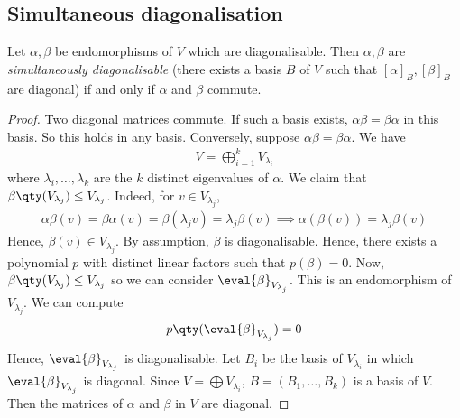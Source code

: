 \subsection{Simultaneous diagonalisation}
\begin{theorem}
	Let $\alpha, \beta$ be endomorphisms of $V$ which are diagonalisable.
	Then $\alpha, \beta$ are \textit{simultaneously diagonalisable} (there exists a basis $B$ of $V$ such that $[\alpha]_B, [\beta]_B$ are diagonal) if and only if $\alpha$ and $\beta$ commute.
\end{theorem}
\begin{proof}
	Two diagonal matrices commute.
	If such a basis exists, $\alpha \beta = \beta \alpha$ in this basis.
	So this holds in any basis.
	Conversely, suppose $\alpha \beta = \beta \alpha$.
	We have
	\begin{align*}
		V = \bigoplus_{i=1}^k V_{\lambda_i}
	\end{align*}
	where $\lambda_i, \dots, \lambda_k$ are the $k$ distinct eigenvalues of $\alpha$.
	We claim that $\beta \qty(V_{\lambda_j}) \leq V_{\lambda_j}$.
	Indeed, for $v \in V_{\lambda_j}$,
	\begin{align*}
		\alpha \beta(v) = \beta \alpha(v) = \beta(\lambda_j v) = \lambda_j \beta(v) \implies \alpha(\beta(v)) = \lambda_j \beta(v)
	\end{align*}
	Hence, $\beta(v) \in V_{\lambda_j}$.
	By assumption, $\beta$ is diagonalisable.
	Hence, there exists a polynomial $p$ with distinct linear factors such that $p(\beta) = 0$.
	Now, $\beta\qty(V_{\lambda_j}) \leq V_{\lambda_j}$ so we can consider $\eval{\beta}_{V_{\lambda_j}}$.
	This is an endomorphism of $V_{\lambda_j}$.
	We can compute
	\begin{align*}
		p\qty(\eval{\beta}_{V_{\lambda_j}}) = 0
	\end{align*}
	Hence, $\eval{\beta}_{V_{\lambda_j}}$ is diagonalisable.
	Let $B_i$ be the basis of $V_{\lambda_i}$ in which $\eval{\beta}_{V_{\lambda_j}}$ is diagonal.
	Since $V = \bigoplus V_{\lambda_i}$, $B = (B_1, \dots, B_k)$ is a basis of $V$.
	Then the matrices of $\alpha$ and $\beta$ in $V$ are diagonal.
\end{proof}

